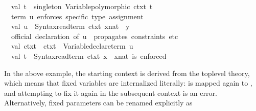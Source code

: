 \begin{isabellebody}
\ \ val\ t{}{}\ {}\ singleton\ {}Variable{}polymorphic\ ctxt{}{}\ t{}{}\isanewline
\isanewline
\ \ {}{}term\ u\ enforces\ specific\ type\ assignment{}{}\isanewline
\ \ val\ u\ {}\ Syntax{}read{}term\ ctxt{}\ {}{}x{}{}nat{}\ {}\ y{}{}\isanewline
\isanewline
\ \ {}{}official\ declaration\ of\ u\ {}{}\ propagates\ constraints\ etc{}{}{}\isanewline
\ \ val\ ctxt{}\ {}\ ctxt{}\ {}{}\ Variable{}declare{}term\ u{}\isanewline
\ \ val\ t{}\ {}\ Syntax{}read{}term\ ctxt{}\ {}x{}{}\ \ {}{}x{}{}nat\ is\ enforced{}{}\isanewline
{}%
\endisatagML
{\isafoldML}%
%
\isadelimML
%
\endisadelimML
%
\begin{isamarkuptext}%
In the above example, the starting context is derived from the
  toplevel theory, which means that fixed variables are internalized
  literally:  is mapped again to , and
  attempting to fix it again in the subsequent context is an error.
  Alternatively, fixed parameters can be renamed explicitly as

\end{isamarkuptext}
\end{isabellebody}
